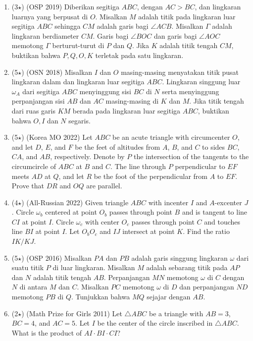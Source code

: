 \documentclass[11pt]{scrartcl}
\begin{document}
\begin{enumerate}
    \item (3$\star$) (OSP 2019) Diberikan segitiga $ABC$, dengan $AC > BC$, dan lingkaran luarnya yang berpusat di $O$. Misalkan $M$ adalah titik pada lingkaran luar segitiga $ABC$ sehingga $CM$ adalah garis bagi $\angle ACB$. Misalkan $\Gamma$ adalah lingkaran berdiameter $CM$. Garis bagi $\angle BOC$ dan garis bagi $\angle AOC$ memotong $\Gamma$ berturut-turut di $P$ dan $Q$. Jika $K$ adalah titik tengah $CM$, buktikan bahwa $P, Q, O, K$ terletak pada satu lingkaran.

    \item (5$\star$) (OSN 2018) Misalkan $I$ dan $O$ masing-masing menyatakan titik pusat lingkaran dalam dan lingkaran luar segitiga $ABC$. Lingkaran singgung luar $\omega_A$ dari segitiga $ABC$ menyinggung sisi $BC$ di $N$ serta menyinggung perpanjangan sisi $AB$ dan $AC$ masing-masing di $K$ dan $M$. Jika titik tengah dari ruas garis $KM$ berada pada lingkaran luar segitiga $ABC$, buktikan bahwa $O, I$ dan $N$ segaris.

    \item (5$\star$) (Korea MO 2022) Let $ABC$ be an acute triangle with circumcenter $O$, and let $D$, $E$, and $F$ be the feet of altitudes from $A$, $B$, and $C$ to sides $BC$, $CA$, and $AB$, respectively. Denote by $P$ the intersection of the tangents to the circumcircle of $ABC$ at $B$ and $C$. The line through $P$ perpendicular to $EF$ meets $AD$ at $Q$, and let $R$ be the foot of the perpendicular from $A$ to $EF$. Prove that $DR$ and $OQ$ are parallel.

    \item (4$\star$) (All-Russian 2022) Given triangle $ABC$ with incenter $I$ and $A$-excenter $J$. Circle $\omega_b$ centered at point $O_b$ passes through point $B$ and is tangent to line $CI$ at point $I$. Circle $\omega_c$ with center $O_c$ passes through point $C$ and touches line $BI$ at point $I$. Let $O_bO_c$ and $IJ$ intersect at point $K$. Find the ratio $IK/KJ$.

    \item (5$\star$) (OSP 2016) Misalkan $PA$ dan $PB$ adalah garis singgung lingkaran $\omega$ dari suatu titik $P$ di luar lingkaran. Misalkan $M$ adalah sebarang titik pada $AP$ dan $N$ adalah titik tengah $AB$. Perpanjangan $MN$ memotong $\omega$ di $C$ dengan $N$ di antara $M$ dan $C$. Misalkan $PC$ memotong $\omega$ di $D$ dan perpanjangan $ND$ memotong $PB$ di $Q$. Tunjukkan bahwa $MQ$ sejajar dengan $AB$.

    \item (2$\star$) (Math Prize for Girls 2011) Let $\triangle ABC$ be a triangle with $AB=3$, $BC=4$, and $AC=5$. Let $I$ be the center of the circle inscribed in $\triangle ABC$. What is the product of $AI \cdot BI \cdot CI$?


\end{enumerate}
\end{document}
